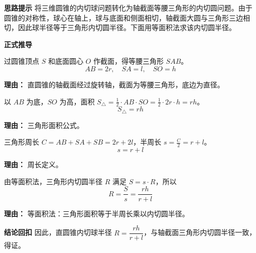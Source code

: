 \begin{proofbox}
	\textbf{\textcolor{CProof}{思路提示}}
	将三维圆锥的内切球问题转化为轴截面等腰三角形的内切圆问题。由于圆锥的对称性，球心在轴上，球与底面和侧面相切，轴截面大圆与三角形三边相切，因此球半径等于三角形内切圆半径。下面用等面积法求该内切圆半径。

	\medskip
	\textbf{\textcolor{CProof}{正式推导}}
	\begin{description}[style=nextline, leftmargin=2.8em, labelsep=0.5em, itemsep=0.55em]
		\item[\textbf{步骤一（轴截面三角形）：}]
			过圆锥顶点 $S$ 和底面圆心 $O$ 作截面，得等腰三角形 $SAB$。
			\[
				AB=2r,\quad SA=l,\quad SO=h
			\]
			\par\textbf{理由：} 直圆锥的轴截面经过旋转轴，截面为等腰三角形，底边为直径。
		\item[\textbf{步骤二（三角形面积）：}]
			以 $AB$ 为底，$SO$ 为高，面积 $S_{\triangle} = \frac12 \cdot AB \cdot SO = \frac12 \cdot 2r \cdot h = rh$。
			\[
				S_{\triangle}=rh
			\]
			\par\textbf{理由：} 三角形面积公式。
		\item[\textbf{步骤三（周长后半周长）：}]
			三角形周长 $C = AB+SA+SB = 2r+2l$，半周长 $s = \frac{C}{2}=r+l$。
			\[
				s=r+l
			\]
			\par\textbf{理由：} 周长定义。
		\item[\textbf{步骤四（内切圆半径公式）：}]
			由等面积法，三角形内切圆半径 $R$ 满足 $S = s\cdot R$，所以
			\[
				R = \frac{S}{s} = \frac{rh}{r+l}
			\]
			\par\textbf{理由：} 等面积法：三角形面积等于半周长乘以内切圆半径。
	\end{description}

	\medskip
	\textbf{\textcolor{CProof}{结论回扣}}
	因此，直圆锥内切球半径 $R = \dfrac{rh}{r+l}$，与轴截面三角形内切圆半径一致，得证。
\end{proofbox}
